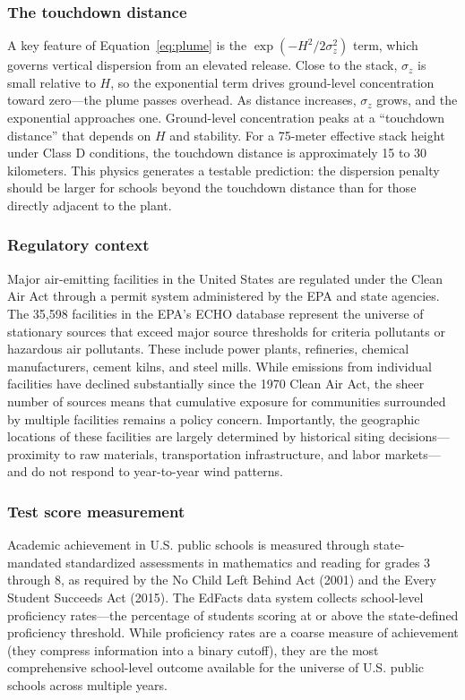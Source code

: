\documentclass[12pt]{article}
\begin{document}
\subsubsection*{The touchdown distance} A key feature of Equation~\ref{eq:plume} is the $\exp(-H^2 / 2\sigma_z^2)$ term, which governs vertical dispersion from an elevated release. Close to the stack, $\sigma_z$ is small relative to $H$, so the exponential term drives ground-level concentration toward zero---the plume passes overhead. As distance increases, $\sigma_z$ grows, and the exponential approaches one. Ground-level concentration peaks at a ``touchdown distance'' that depends on $H$ and stability. For a 75-meter effective stack height under Class D conditions, the touchdown distance is approximately 15 to 30 kilometers. This physics generates a testable prediction: the dispersion penalty should be larger for schools beyond the touchdown distance than for those directly adjacent to the plant.

\subsubsection*{Regulatory context} Major air-emitting facilities in the United States are regulated under the Clean Air Act through a permit system administered by the EPA and state agencies. The 35,598 facilities in the EPA's ECHO database represent the universe of stationary sources that exceed major source thresholds for criteria pollutants or hazardous air pollutants. These include power plants, refineries, chemical manufacturers, cement kilns, and steel mills. While emissions from individual facilities have declined substantially since the 1970 Clean Air Act, the sheer number of sources means that cumulative exposure for communities surrounded by multiple facilities remains a policy concern. Importantly, the geographic locations of these facilities are largely determined by historical siting decisions---proximity to raw materials, transportation infrastructure, and labor markets---and do not respond to year-to-year wind patterns.

\subsubsection*{Test score measurement} Academic achievement in U.S. public schools is measured through state-mandated standardized assessments in mathematics and reading for grades 3 through 8, as required by the No Child Left Behind Act (2001) and the Every Student Succeeds Act (2015). The EdFacts data system collects school-level proficiency rates---the percentage of students scoring at or above the state-defined proficiency threshold. While proficiency rates are a coarse measure of achievement (they compress information into a binary cutoff), they are the most comprehensive school-level outcome available for the universe of U.S. public schools across multiple years.
\end{document}
